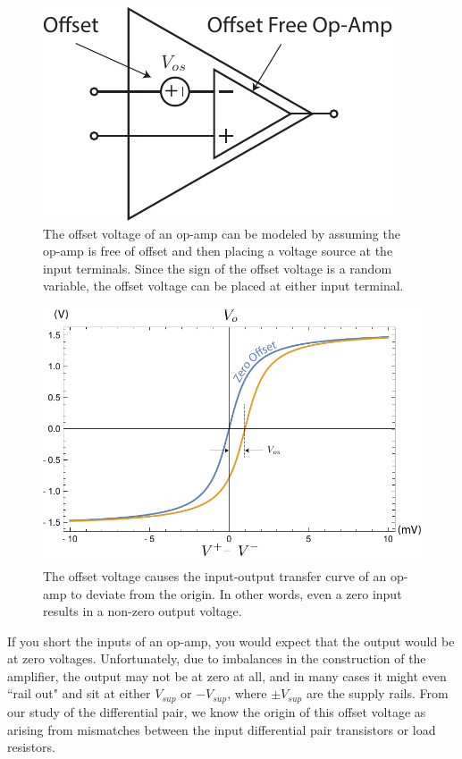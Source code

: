 \begin{figure}[tb]
\begin{center}
\includegraphics[scale=1]{opamp_offset}
\end{center}
\caption{The offset voltage of an op-amp can be modeled by assuming the op-amp is free of offset and then placing a voltage source at the input terminals.  Since the sign of the offset voltage is a random variable, the offset voltage can be placed at either input terminal.} \label{fig:opamp_offset}
\end{figure}

\begin{figure}[tb]
\begin{center}
\includegraphics[width=.75\columnwidth]{opamp_offset_plot}
\end{center}
\caption{The offset voltage causes the input-output transfer curve of an op-amp to deviate from the origin.  In other words, even a zero input results in a non-zero output voltage.} \label{fig:opamp_offset_plot}
\end{figure}

If you short the inputs of an op-amp, you would expect that the output would be at zero voltages.  Unfortunately, due to imbalances in the construction of the amplifier, the output may not be at zero at all, and in many cases it might even ``rail out" and sit at either $V_{sup}$ or $-V_{sup}$, where $\pm V_{sup}$ are the supply rails.  From our study of the differential pair, we know the origin of this offset voltage as arising from mismatches between the input differential pair transistors or load resistors.  

